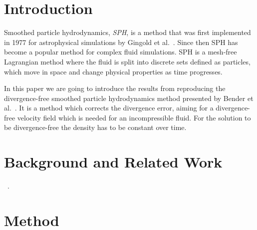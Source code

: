 \section{Introduction}
    Smoothed particle hydrodynamics, \textit{SPH}, is a method that was first implemented in 1977 for astrophysical simulations by Gingold et al.~\cite{firstSPH}.
    Since then SPH has become a popular method for complex fluid simulations.
    SPH is a mesh-free Lagrangian method where the fluid is split into discrete sets defined as particles, which move in space and change physical properties as time progresses.
    
    In this paper we are going to introduce the results from reproducing the divergence-free smoothed particle hydrodynamics method presented by Bender et al.~\cite{bender}.
    It is a method which corrects the divergence error, aiming for a divergence-free velocity field which is needed for an incompressible fluid.
    For the solution to be divergence-free the density has to be constant over time.
    

\section{Background and Related Work}

    ~\cite{bridson}.



\section{Method}

